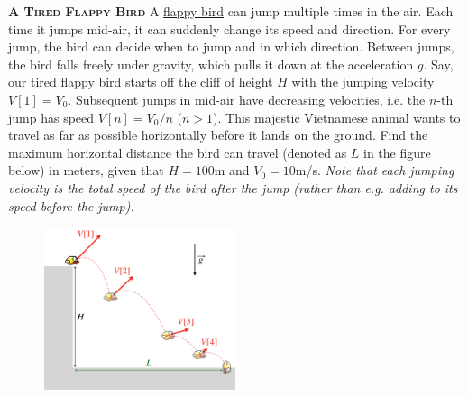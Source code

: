 \begin{problem}{\textbf{\textsc{A Tired Flappy Bird}}} A \href{https://flappybird.io/}{flappy bird} can jump multiple times in the air. Each time it jumps mid-air, it can suddenly change its speed and direction. For every jump, the bird can decide when to jump and in which direction. Between jumps, the bird falls freely under gravity, which pulls it down at the acceleration $g$. Say, our tired flappy bird starts off the cliff of height $H$ with the jumping velocity $V[1]=V_0$. Subsequent jumps in mid-air have decreasing velocities, i.e. the $n$-th jump has speed $V[n]=V_0/n$ ($n>1$). This majestic Vietnamese animal wants to travel as far as possible horizontally before it lands on the ground. Find the maximum horizontal distance the bird can travel (denoted as $L$ in the figure below) in meters, given that $H=100$m and $V_0=10$m/s. \textit{Note that each jumping velocity is the total speed of the bird after the jump (rather than e.g. adding to its speed before the jump).}

\FloatBarrier
\begin{figure}[!htbp]
\centering
\includegraphics[width=0.5\textwidth]{problems/figures/flappybird.png}
\end{figure}
\FloatBarrier

\end{problem}